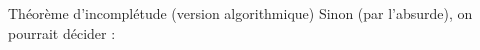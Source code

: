 \begin{frame}{Théorème d'incomplétude (version algorithmique)}
    \pause
    \vspace{3mm}
     Sinon (par l'absurde), on pourrait décider  :
    \begin{algorithm}[H]
    \end{algorithm}
    
\end{frame}

\endgroup
